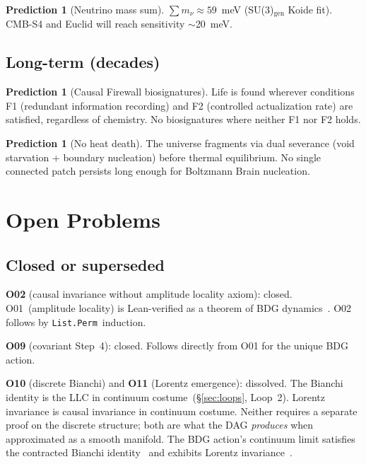 \documentclass[11pt,a4paper]{article}
\theoremstyle{plain}
\theoremstyle{definition}
\newtheorem{prediction}[theorem]{Prediction}
\theoremstyle{remark}
\begin{document}
\begin{prediction}[Neutrino mass sum]\label{pred:neutrino}
$\sum m_\nu \approx 59$~meV (SU(3)$_{\mathrm{gen}}$ Koide fit).
CMB-S4 and Euclid will reach sensitivity $\sim$20~meV.
\end{prediction}

\subsection{Long-term (decades)}\label{sec:pred-long}

\begin{prediction}[Causal Firewall biosignatures]\label{pred:firewall}
Life is found wherever conditions F1 (redundant information recording) and F2
(controlled actualization rate) are satisfied, regardless of chemistry.  No
biosignatures where neither F1 nor F2 holds.
\end{prediction}

\begin{prediction}[No heat death]\label{pred:heatdeath}
The universe fragments via dual severance (void starvation + boundary
nucleation) before thermal equilibrium.  No single connected patch persists long
enough for Boltzmann Brain nucleation.
\end{prediction}

\section{Open Problems}\label{sec:open}

\subsection{Closed or superseded}\label{sec:open-closed}

\textbf{O02} (causal invariance without amplitude locality axiom): closed.
O01~(amplitude locality) is Lean-verified as a theorem of BDG
dynamics~\cite{Sandeman2026AmpLoc}.  O02 follows by
\texttt{List.Perm}~induction.

\textbf{O09} (covariant Step~4): closed.  Follows directly from O01 for the
unique BDG action.

\textbf{O10} (discrete Bianchi) and \textbf{O11} (Lorentz emergence):
dissolved.  The Bianchi identity is the LLC in continuum
costume~(\S\ref{sec:loops}, Loop~2).  Lorentz invariance is causal invariance in
continuum costume.  Neither requires a separate proof on the discrete structure;
both are what the DAG \emph{produces} when approximated as a smooth manifold.
The BDG action's continuum limit satisfies the contracted Bianchi
identity~\cite{BenincasaDowker2010} and exhibits Lorentz
invariance~\cite{DowkerGlaser2013}.
\end{document}
